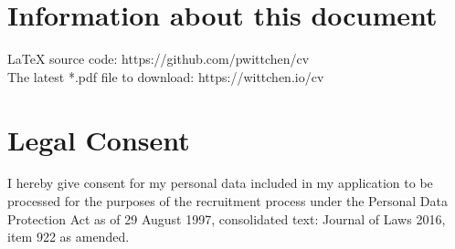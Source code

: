 \documentclass[letterpaper,11pt]{article}
\begin{document}
\section{Information about this document}
 \begin{itemize}[leftmargin=0.15in, label={}]
    \small{\item{
    {LaTeX source code: https://github.com/pwittchen/cv} \\
    {The latest *.pdf file to download: https://wittchen.io/cv}
    }}
 \end{itemize}

\section{Legal Consent}
 \begin{itemize}[leftmargin=0.15in, label={}]
    \small{\item{
    I hereby give consent for my personal data included in my application
    to be processed for the purposes of the recruitment process
    under the Personal Data Protection Act as of 29 August 1997,
    consolidated text: Journal of Laws 2016, item 922 as amended. \\
    }}
 \end{itemize}

\end{document}
